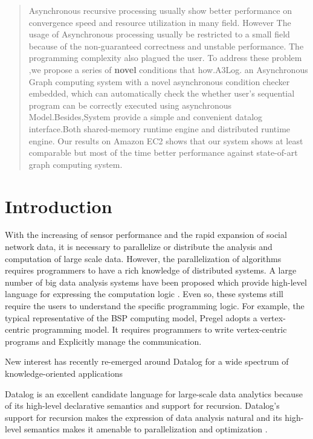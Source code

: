 \documentclass{vldb}
\begin{document}
\maketitle

\begin{abstract}
Asynchronous recursive processing usually show better performance on convergence speed and resource utilization in many field. However The usage of Asynchronous processing usually be restricted to a small field because of the non-guaranteed correctness and unstable performance. The programming complexity also plagued the user. To address these problem ,we propose a series of \textbf{novel} conditions that how.A3Log. an Asynchronous Graph computing system with a novel asynchronous condition checker embedded, which can  automatically check the whether  user's sequential program can be correctly executed using asynchronous Model.Besides,System provide a simple and convenient datalog interface.Both shared-memory runtime engine and distributed runtime engine. Our results on Amazon EC2 shows that our system shows at least comparable but most of the time better performance against state-of-art graph computing system.
\end{abstract}




\section{Introduction}
With the increasing of sensor performance and the rapid expansion of social network data, it is necessary to parallelize or distribute the analysis and computation of large scale data. However, the parallelization of algorithms requires programmers to have a rich knowledge of distributed systems. A large number of big data analysis systems have been proposed which provide high-level language for expressing the computation logic \cite{}. Even so, these systems still require the users to understand the specific programming logic. For example, the typical representative of the BSP computing model, Pregel \cite{} adopts a vertex-centric programming model. It requires programmers to write vertex-centric programs and Explicitly manage the communication.

New interest has recently re-emerged around Datalog for a wide spectrum of knowledge-oriented applications \cite{}%

Datalog is an excellent candidate language for large-scale data analytics because of its high-level declarative semantics and support for recursion. Datalog's support for recursion makes the expression of data analysis natural \cite{} and its high-level semantics makes it amenable to parallelization and optimization \cite{}.
\end{document}
